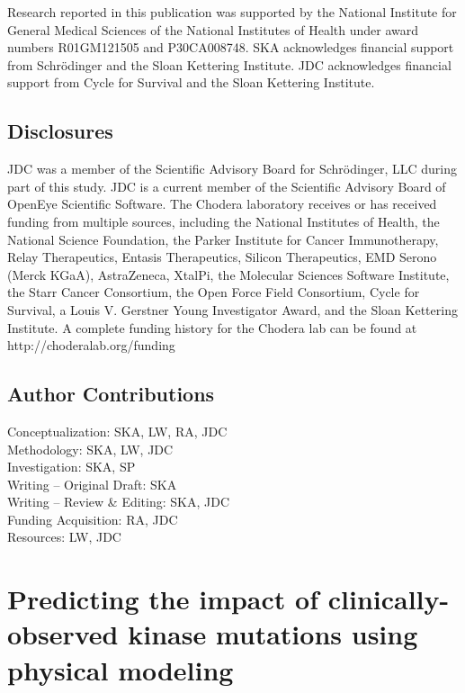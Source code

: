 \documentclass[phd,tocprelim]{cornell}
\begin{document}
Research reported in this publication was supported by the National Institute for General Medical Sciences of the National Institutes of Health under award numbers R01GM121505 and P30CA008748.
SKA acknowledges financial support from Schr\"{o}dinger and the Sloan Kettering Institute.
JDC acknowledges financial support from Cycle for Survival and the Sloan Kettering Institute.


\section{Disclosures}

JDC was a member of the Scientific Advisory Board for Schrödinger, LLC during part of this study.
JDC is a current member of the Scientific Advisory Board of OpenEye Scientific Software.
The Chodera laboratory receives or has received funding from multiple sources, including the National Institutes of Health, the National Science Foundation, the Parker Institute for Cancer Immunotherapy, Relay Therapeutics, Entasis Therapeutics, Silicon Therapeutics, EMD Serono (Merck KGaA), AstraZeneca, XtalPi, the Molecular Sciences Software Institute, the Starr Cancer Consortium, the Open Force Field Consortium, Cycle for Survival, a Louis V. Gerstner Young Investigator Award, and the Sloan Kettering Institute.
A complete funding history for the Chodera lab can be found at http://choderalab.org/funding


\section{Author Contributions}
Conceptualization: SKA, LW, RA, JDC \\
Methodology: SKA, LW, JDC\\
Investigation: SKA, SP\\
Writing -- Original Draft: SKA\\
Writing -- Review \& Editing: SKA, JDC \\
Funding Acquisition: RA, JDC\\
Resources: LW, JDC\\


\chapter{Predicting the impact of clinically-observed kinase mutations using physical modeling}
\end{document}
